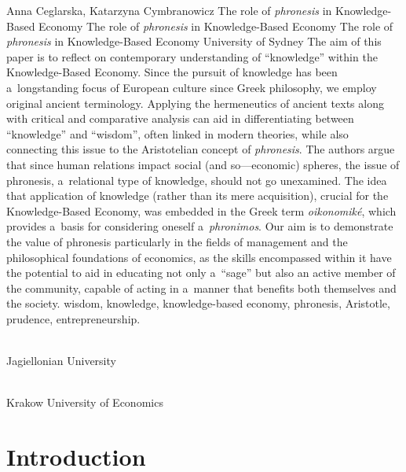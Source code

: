 \begin{artengenv2auth}{Anna Ceglarska, Katarzyna Cymbranowicz}
	{The role of \textit{phronesis} in Knowledge-Based Economy}
		{The role of \textit{phronesis} in Knowledge-Based Economy}
		{The role of \textit{phronesis} in Knowledge-Based Economy}
	{University of Sydney}
	{The aim of this paper is to reflect on contemporary understanding of ``knowledge'' within the Knowledge-Based Economy. Since the pursuit of knowledge has been a~longstanding focus of European culture since Greek philosophy, we employ original ancient terminology. Applying the hermeneutics of ancient texts along with critical and comparative analysis can aid in differentiating between ``knowledge'' and ``wisdom'', often linked in modern theories, while also connecting this issue to the Aristotelian concept of \textit{phronesis}. The authors argue that since human relations impact social (and so---economic) spheres, the issue of phronesis, a~relational type of knowledge, should not go unexamined. The idea that application of knowledge (rather than its mere acquisition), crucial for the Knowledge-Based Economy, was embedded in the Greek term \textit{oikonomiké}, which provides a~basis for considering oneself a~\textit{phronimos}. Our aim is to demonstrate the value of phronesis particularly in the fields of management and the philosophical foundations of economics, as the skills encompassed within it have the potential to aid in educating not only a~``sage'' but also an active member of the community, capable of acting in a~manner that benefits both themselves and the society.
		}
		{wisdom, knowledge, knowledge-based economy, phronesis, Aristotle, prudence, entrepreneurship.}
	{%
		{\flushright{}\\\subsubsectit\small{Jagiellonian University}\label{ceglarska-firstpage}\par}%
		{\flushright{}\\\subsubsectit\small{Krakow University of Economics}\par}%
	}




\section{Introduction}


\end{artengenv2auth}
